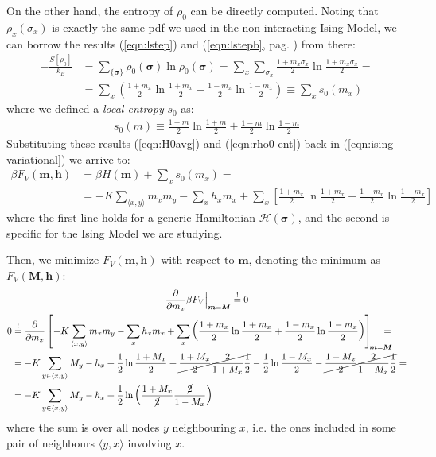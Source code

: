 \documentclass[../../main.tex]{subfiles}
\begin{document}
On the other hand, the entropy of $\rho_0$ can be directly computed. Noting that $\rho_x(\sigma_x)$ is exactly the same pdf we used in the non-interacting Ising Model, we can borrow the results (\ref{eqn:lstep}) and (\ref{eqn:lstepb}, pag. \pageref{eqn:lstep}) from there:
\begin{align}\nonumber
    -\frac{S[\rho_0]}{k_B} &= \sum_{\{\bm{\sigma}\}} \rho_0(\bm{\sigma}) \ln \rho_0(\bm{\sigma}) = \sum_x \sum_{\sigma_x} \frac{1+m_x \sigma_x}{2} \ln \frac{1+m_x \sigma_x}{2} =\\ \label{eqn:rho0-ent}
    &= \sum_x \left(\frac{1+m_x}{2} \ln \frac{1+m_x}{2} + \frac{1-m_x}{2} \ln \frac{1-m_x}{2} \right)  \equiv \sum_x s_0(m_x)
\end{align}
where we defined a \textit{local entropy} $s_0$ as: 
\begin{align*}
    s_0(m) \equiv \frac{1+m}{2} \ln \frac{1+m}{2} + \frac{1-m}{2} \ln \frac{1-m}{2}    
\end{align*}
Substituting these results (\ref{eqn:H0avg}) and (\ref{eqn:rho0-ent}) back in (\ref{eqn:ising-variational}) we arrive to:
\begin{align} \label{eqn:var-free-energy}
    \beta F_V(\bm{m}, \bm{h}) &= \beta H(\bm{m}) + \sum_x s_0(m_x) =\\
    &= -K \sum_{\langle x,y \rangle} m_x m_y - \sum_x h_x m_x + \sum_x \left[\frac{1+m_x}{2} \ln \frac{1+m_x}{2} + \frac{1-m_x}{2} \ln \frac{1-m_x}{2}    \right] \nonumber
\end{align}
where the first line holds for a generic Hamiltonian $\mathcal{H}(\bm{\sigma})$, and the second is specific for the Ising Model we are studying.

\medskip

Then, we minimize $F_V(\bm{m}, \bm{h})$ with respect to $\bm{m}$, denoting the minimum as $F_V(\bm{M}, \bm{h})$:
\begin{align}
    \label{eqn:minimize}
    \pdv{m_x} \beta F_V \Big|_{\bm{m} = \bm{M}} \overset{!}{=}  0 \span \\ \nonumber
    0 &\overset{!}{=} \pdv{m_x} \left[-K \sum_{\langle x,y \rangle} m_x m_y - \sum_x h_x m_x + \sum_x \left(\frac{1+m_x}{2} \ln \frac{1+m_x}{2} + \frac{1-m_x}{2} \ln \frac{1-m_x}{2}    \right) \right]_{\quad\mathclap{\bm{m} = \bm{M}}} =\\ \nonumber
    &=-K\sum_{y \in \langle x,y \rangle} M_y - h_x + \frac{1}{2}\ln \frac{1+M_x}{2} + \cancel{\frac{1+M_x}{2} \frac{2}{1+M_x}\frac{1}{2}} - \frac{1}{2} \ln \frac{1-M_x}{2} - \cancel{\frac{1-M_x}{2} \frac{2}{1-M_x}\frac{1}{2}} =\\ \nonumber
    &= -K\sum_{y \in \langle x,y \rangle} M_y -h_x + \frac{1}{2} \ln\left(\frac{1+M_x}{\cancel{2}} \frac{\cancel{2}}{1-M_x}  \right) 
\end{align} 
where the sum is over all nodes $y$ neighbouring $x$, i.e. the ones included in some pair of neighbours $\langle y,x \rangle$ involving $x$.
\end{document}
